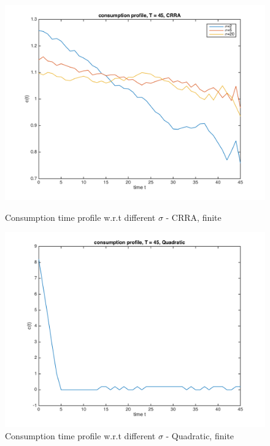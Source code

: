 \documentclass{article}[a4paper]
\begin{document}
\begin{figure}[htbp]
\centering
\begin{minipage}[t]{0.48\textwidth}
\includegraphics[width=\textwidth]{img/sigmacompare1.png}
\caption{Consumption time profile w.r.t different $\sigma$ - CRRA, finite}
\end{minipage}
\begin{minipage}[t]{0.48\textwidth}
\centering
\includegraphics[width=\textwidth]{img/sigmacompare2.png}
\caption{Consumption time profile w.r.t different $\sigma$ - Quadratic, finite}
\end{minipage}
\end{figure}
\end{document}
